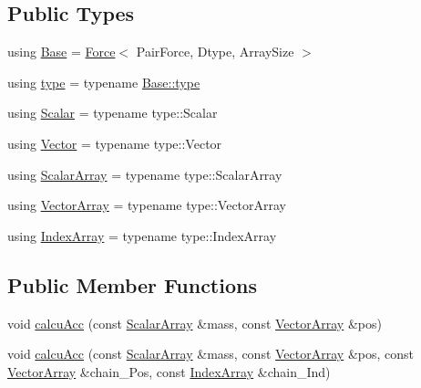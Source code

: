 \subsection*{Public Types}
\begin{DoxyCompactItemize}
\item 
using \mbox{\hyperlink{struct_space_h_1_1_vel_indep_force_a701c4046691703996abfd8d231a0caac}{Base}} = \mbox{\hyperlink{struct_space_h_1_1_force}{Force}}$<$ Pair\+Force, Dtype, Array\+Size $>$
\item 
using \mbox{\hyperlink{struct_space_h_1_1_vel_indep_force_a01b848e02573e4aa9580cec647efda9c}{type}} = typename \mbox{\hyperlink{struct_space_h_1_1_force_a151c6ae1ec7ad87825c2b6cc74aee5f2}{Base\+::type}}
\item 
using \mbox{\hyperlink{struct_space_h_1_1_vel_indep_force_acd8813e87e53d01f1c824fcac58b7c1e}{Scalar}} = typename type\+::\+Scalar
\item 
using \mbox{\hyperlink{struct_space_h_1_1_vel_indep_force_abc12ce8c91664111b8d37b9d439c7b89}{Vector}} = typename type\+::\+Vector
\item 
using \mbox{\hyperlink{struct_space_h_1_1_vel_indep_force_a05d04af454b5217024f5fff45d7e4d32}{Scalar\+Array}} = typename type\+::\+Scalar\+Array
\item 
using \mbox{\hyperlink{struct_space_h_1_1_vel_indep_force_a6b4e8ca988b015e7f956f015991ecd80}{Vector\+Array}} = typename type\+::\+Vector\+Array
\item 
using \mbox{\hyperlink{struct_space_h_1_1_vel_indep_force_ac8dcda8c288da58df2f706259eeae0a9}{Index\+Array}} = typename type\+::\+Index\+Array
\end{DoxyCompactItemize}
\subsection*{Public Member Functions}
\begin{DoxyCompactItemize}
\item 
void \mbox{\hyperlink{struct_space_h_1_1_vel_indep_force_a38036f5de71884159cbb513883379ae9}{calcu\+Acc}} (const \mbox{\hyperlink{struct_space_h_1_1_vel_indep_force_a05d04af454b5217024f5fff45d7e4d32}{Scalar\+Array}} \&mass, const \mbox{\hyperlink{struct_space_h_1_1_vel_indep_force_a6b4e8ca988b015e7f956f015991ecd80}{Vector\+Array}} \&pos)
\item 
void \mbox{\hyperlink{struct_space_h_1_1_vel_indep_force_a82661f96988b6dfa6e7b13db4906cd57}{calcu\+Acc}} (const \mbox{\hyperlink{struct_space_h_1_1_vel_indep_force_a05d04af454b5217024f5fff45d7e4d32}{Scalar\+Array}} \&mass, const \mbox{\hyperlink{struct_space_h_1_1_vel_indep_force_a6b4e8ca988b015e7f956f015991ecd80}{Vector\+Array}} \&pos, const \mbox{\hyperlink{struct_space_h_1_1_vel_indep_force_a6b4e8ca988b015e7f956f015991ecd80}{Vector\+Array}} \&chain_\+Pos, const \mbox{\hyperlink{struct_space_h_1_1_vel_indep_force_ac8dcda8c288da58df2f706259eeae0a9}{Index\+Array}} \&chain_\+Ind)
\end{DoxyCompactItemize}
